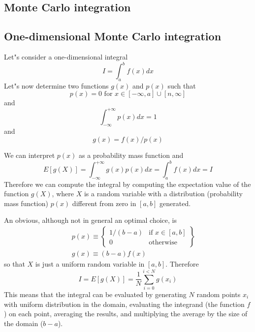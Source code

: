 \documentclass[justified, sixbynine]{tufte-book}
\theoremstyle{plain}%
\newtheorem * {corollary}{Corollary}
\theoremstyle{definition}
\theoremstyle{remark}
\newtheorem * {remark}{Remark}
\newtheorem * {note}{Note}
\begin{document}
\begin{fullwidth}
\section{Monte Carlo integration}

\goodbreak\subsection{One-dimensional Monte Carlo integration}

Let"s consider a one-dimensional integral
\begin{equation}
I=\int_a^bf(x)dx
\end{equation}
Let"s now determine two functions $g(x)$ and $p(x)$ such that
\begin{equation}
p(x)=0\text{ for }x\in [-\infty , a]\cup [n, \infty ]
\end{equation}
and
\begin{equation}
\int_{-\infty }^{+\infty }p(x)dx=1
\end{equation}
and
\begin{equation}
g(x)=f(x)/p(x)
\end{equation}

We can interpret $p(x)$ as a probability mass function and
\begin{equation}
E[g(X)]=\int_{-\infty }^{+\infty }g(x)p(x)dx=\int_a^bf(x)dx=I
\end{equation}
Therefore we can compute the integral by computing the expectation value of
the function $g(X)$, where $X$ is a random variable with a distribution
(probability mass function) $p(x)$ different from zero in $[a, b]$ generated.

An obvious, although not in general an optimal choice, is
\begin{eqnarray}
&&p(x)\equiv \left\{
\begin{array}{ll}
1/(b-a) & \text{if }x\in [a, b] \\
0 & \text{otherwise}
\end{array}
\right\}   \label{defchoice} \\
&&g(x)\equiv (b-a)f(x)  \nonumber
\end{eqnarray}
so that $X$ is just a uniform random variable in $[a, b]$. Therefore
\begin{equation}
I=E\left[ g(X)\right] =\frac1N \sum_{i=0}^{i<N}g(x_i)
\end{equation}
This means that the integral can be evaluated by generating $N$ random
points $x_i$ with uniform distribution in the domain, evaluating the
integrand (the function $f$) on each point, averaging the results, and
multiplying the average by the size of the domain ($b-a$).


\end{fullwidth}
\end{document}
